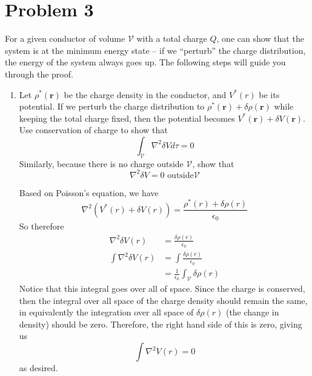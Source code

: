 \documentclass[10pt]{article}
\newcommand{\laplace}{\nabla^2}
\begin{document}
	\pagebreak
	\section*{Problem 3}

	For a given conductor of volume $\mathcal V$ with a total charge $Q$, one can show that the system is at 
	the minimum energy state -- if we ``perturb'' the charge distribution, the energy of the system always goes 
	up. The following steps will guide you through the proof. 

	\begin{enumerate}[label=\arabic*.]
		\item Let $\rho^*(\mathbf r)$ be the charge density in the conductor, and $V^*(r)$ be its potential. If
			we perturb the charge distribution to $\rho^*(\mathbf r) + \delta \rho(\mathbf r)$ while keeping the
			total charge fixed, then the potential becomes $V^*(\mathbf r) + \delta V(\mathbf r)$. Use 
			conservation of charge to show that 
			\[
				\int_{\mathcal V} \nabla^2 \delta V d\tau = 0
			\] 
			Similarly, because there is no charge outside $\mathcal V$, show that
			\[
			\nabla^2 \delta V= 0 \text{  outside} \mathcal V
			\] 

			\begin{solution}
				Based on Poisson's equation, we have
				\[ 
					\laplace (V^*(r) + \delta V(r)) = \frac{\rho^*(r) + \delta \rho(r)}{\epsilon_0}
				\] 
				So therefore 
				\begin{align*}
					\laplace \delta V(r) &= \frac{\delta \rho(r)}{\epsilon_0}\\
					\int \laplace \delta V(r)&=  \int \frac{\delta \rho(r)}{\epsilon_0}	\\
											 &= \frac{1}{\epsilon_0}\int_{\mathcal V} \delta \rho(r) 
				\end{align*}
				Notice that this integral goes over all of space. Since the charge is conserved, then the 
				integral over all space of the charge density should remain the same, in equivalently the 
				integration over all space of $\delta \rho(r)$ (the change in density) should be zero. Therefore,
				the right hand side of this is zero, giving us 
				\[
				\int \laplace V(r) = 0
				\] 
				as desired. 


\end{solution}
\end{enumerate}
\end{document}
